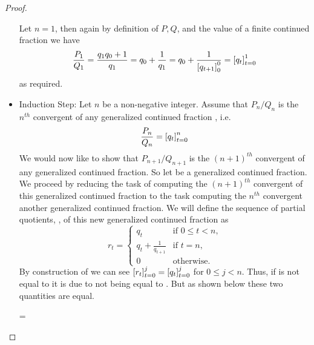 \begin{proof}
\begin{itemize}
                    Let $n = 1$, then again by definition of $P, Q$, and the value of a finite
                    continued fraction we have
                    \[
                        \frac{P_1}{Q_1} = \frac{q_1q_0 + 1}{q_1} = q_0 + \frac{1}{q_1}
                                        = q_0 + \frac{1}{\left[ q_{t + 1} \right]_{0}^{0}}
                                        = \left[ q_t \right]_{t = 0}^{1}
                    \]
                    as required.
                \item
                    Induction Step: Let $n$ be a non-negative integer. Assume that
                    $P_n / Q_n$ is the $n^{th}$ convergent of any generalized continued
                    fraction , i.e.
                    \begin{equation}
                        \frac{P_n}{Q_n} = \left[ q_t \right]_{t = 0}^{n}
                    \end{equation}
                    We would now like to show that $P_{n + 1} / Q_{n + 1}$ is the $(n + 1)^{th}$
                    convergent of any generalized continued fraction. So let 
                    be a generalized continued fraction. We proceed by reducing the task of
                    computing the $(n + 1)^{th}$ convergent of this generalized continued 
                    fraction to the task computing the $n^{th}$ convergent another generalized
                    continued fraction. We will define the sequence of partial quotients,
                    , of this new generalized continued fraction as
                    \begin{equation}
                        r_t = \begin{cases}
                            q_t & \mbox{if $0 \le t < n$,} \\
                            q_t + \frac{1}{q_{t + 1}} & \mbox{if $t = n$,} \\
                            0 & \mbox{otherwise}.
                        \end{cases}
                    \end{equation}
                    By construction of  we can see
                    $\left[ r_t \right]_{t = 0}^{j} = \left[ q_t \right]_{t = 0}^{j}$ for $0 \le j < n$.
                    Thus, if  is not equal to 
                    it is due to  not being equal to .
                    But as shown below these two quantities are equal.
                    \begin{derivation}{=}

\end{derivation}
\end{itemize}
\end{proof}

